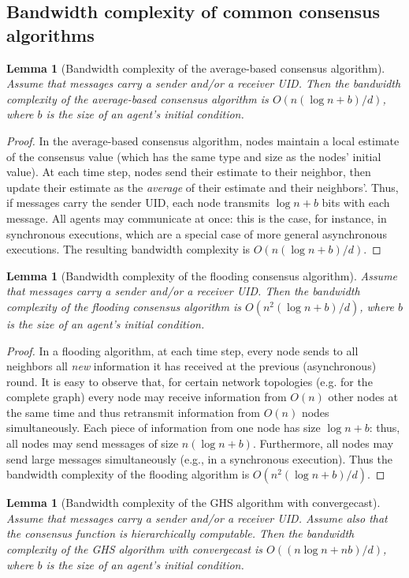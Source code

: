 \documentclass[letterpaper,10pt,conference]{ieeeconf}
\newtheorem{lemma}[theorem]{Lemma}
\begin{document}
\subsection{Bandwidth complexity of common consensus algorithms}
\begin{lemma}[Bandwidth complexity of the average-based consensus algorithm]
\label{prop:avgbased}
Assume that messages carry a sender and/or a receiver UID. Then the bandwidth complexity of the average-based consensus algorithm is $O(n(\log n + b)/d)$, where $b$ is the size of an agent's initial condition.
\end{lemma}
\begin{proof}
In the average-based consensus algorithm, nodes maintain a local estimate of the consensus value (which has the same type and size as the nodes' initial value). At each time step, nodes send their estimate to their neighbor, then update their estimate as the \emph{average} of their estimate and their neighbors'. Thus, if messages carry the sender UID, each node transmits $\log n +b$ bits with each message. All agents may communicate at once: this is the case, for instance, in synchronous executions, which are a special case of more general asynchronous executions. The resulting bandwidth complexity is $O(n(\log n + b)/d)$.  
\end{proof}
\begin{lemma}[Bandwidth complexity of the flooding consensus algorithm]
\label{prop:flooding}
Assume that messages carry a sender and/or a receiver UID. Then the bandwidth complexity of the flooding consensus algorithm is $O(n^2(\log n + b)/d)$, where $b$ is the size of an agent's initial condition.
\end{lemma}
\begin{proof}
In a flooding algorithm, at each time step, every node sends to all neighbors all \emph{new} information it has received at the previous (asynchronous) round. It is easy to observe that, for certain network topologies (e.g. for the complete graph) every node may receive information from $O(n)$ other nodes at the same time and thus retransmit information from $O(n)$ nodes simultaneously. Each piece of information from one node has size $\log n + b$: thus, all nodes may send messages of size $n(\log n + b)$. Furthermore, all nodes may send large messages simultaneously (e.g., in a synchronous execution). Thus the bandwidth complexity of the flooding algorithm is $O(n^2(\log n + b)/d)$. 
\end{proof}
\begin{lemma}[Bandwidth complexity of the GHS algorithm with convergecast]
\label{prop:GHSub}
Assume that messages carry a sender and/or a receiver UID. Assume also that the consensus function is hierarchically computable. Then the bandwidth complexity of the GHS algorithm with convergecast is $O((n\log n+nb)/d)$, where $b$ is the size of an agent's initial condition.
\end{lemma}
\end{document}
